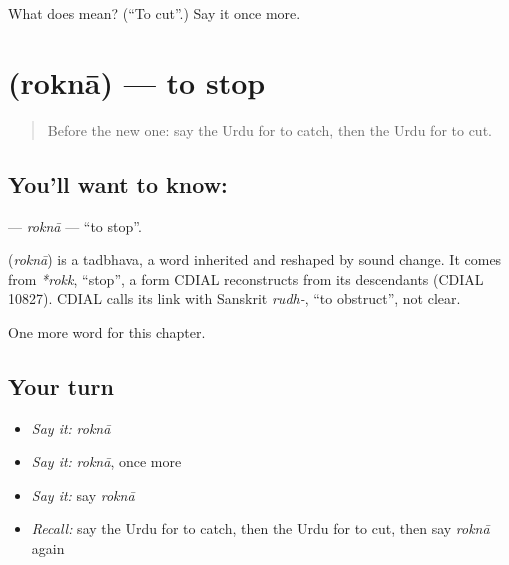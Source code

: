 \begin{tcolorbox}[breakable,colback=teal!4,colframe=teal!35!black,title={Before you move on}]
What does  mean? (\textquotedblleft{}To cut\textquotedblright{}.) Say it once more.
\end{tcolorbox}
\section[\texorpdfstring{\ur{روکنا} (roknā)}{روکنا (roknā)}]{ (roknā) — to stop}

\label{lesson:UR-C52-rokna}



\begin{quote}
Before the new one: say the Urdu for to catch, then the Urdu for to cut.
\end{quote}

\subsection*{You'll want to know: }
\textbf{} — \emph{roknā} — \textquotedblleft{}to stop\textquotedblright{}.

\begin{cousinweb}
\textbf{} (\emph{roknā}) is a tadbhava, a word inherited and reshaped by sound change. It comes from \emph{*rokk}, \textquotedblleft{}stop\textquotedblright{}, a form CDIAL reconstructs from its descendants (CDIAL 10827). CDIAL calls its link with Sanskrit \emph{rudh-}, \textquotedblleft{}to obstruct\textquotedblright{}, not clear.
\end{cousinweb}

\begin{grammarlens}[title={What you've built}]
One more word for this chapter.
\end{grammarlens}

\subsection*{Your turn}
\begin{itemize}
\raggedright
  \item \emph{Say it:} \emph{roknā}
  \item \emph{Say it:} \emph{roknā}, once more
  \item \emph{Say it:} say \emph{roknā}
  \item \emph{Recall:} say the Urdu for to catch, then the Urdu for to cut, then say \emph{roknā} again
\end{itemize}

